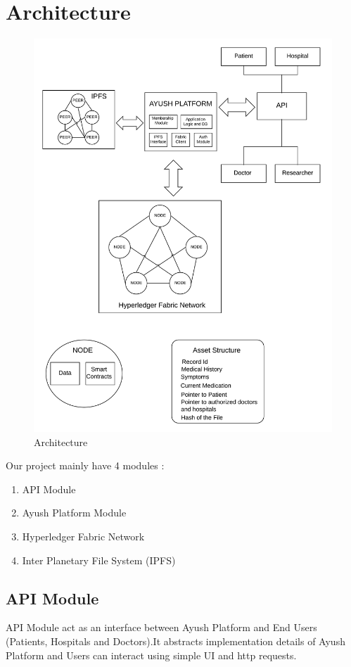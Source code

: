 \documentclass[11pt]{report}
\begin{document}
\section{Architecture}        
\begin{figure}[h!]
        \centering
        \includegraphics[scale=0.7]{arch.jpeg}
        \caption{Architecture}
        \label{fig:my_label}
    \end{figure} 
Our project mainly have 4 modules :
\begin{enumerate}
    \item API Module
    \item Ayush Platform Module
    \item Hyperledger Fabric Network
    \item Inter Planetary File System (IPFS) 
\end{enumerate}
\subsection{API Module}
API Module act as an interface between Ayush Platform and End Users (Patients, Hospitals and Doctors).It abstracts implementation details of Ayush Platform and Users can interact using simple UI and http requests. 
\end{document}
